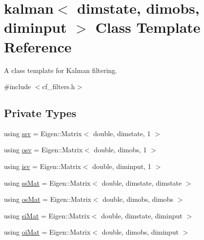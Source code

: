 \hypertarget{classkalman}{}\section{kalman$<$ dimstate, dimobs, diminput $>$ Class Template Reference}
\label{classkalman}


A class template for Kalman filtering.  




{\ttfamily \#include $<$cf\+\_\+filters.\+h$>$}

\subsection*{Private Types}
\begin{DoxyCompactItemize}
\item 
using \hyperlink{classkalman_a12e789b80f9b1e17cecdf93c32cc35ed}{ssv} = Eigen\+::\+Matrix$<$ double, dimstate, 1 $>$
\item 
using \hyperlink{classkalman_a59427bc89132911a2afb9f42ebff0b28}{osv} = Eigen\+::\+Matrix$<$ double, dimobs, 1 $>$
\item 
using \hyperlink{classkalman_ab085cc62231ff087133f8b24e052a36e}{isv} = Eigen\+::\+Matrix$<$ double, diminput, 1 $>$
\item 
using \hyperlink{classkalman_a9d46100ff92b06fad10f14d722a5ce94}{ss\+Mat} = Eigen\+::\+Matrix$<$ double, dimstate, dimstate $>$
\item 
using \hyperlink{classkalman_a092ff444bcb70f49972e645bc993fd79}{os\+Mat} = Eigen\+::\+Matrix$<$ double, dimobs, dimobs $>$
\item 
using \hyperlink{classkalman_a8311e2213ec968dc595add5f6933d091}{si\+Mat} = Eigen\+::\+Matrix$<$ double, dimstate, diminput $>$
\item 
using \hyperlink{classkalman_a2a9c411927e8ae35144b2c40dac2f3d1}{oi\+Mat} = Eigen\+::\+Matrix$<$ double, dimobs, diminput $>$
\end{DoxyCompactItemize}

